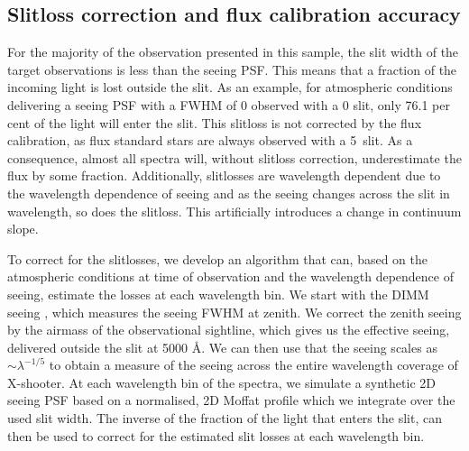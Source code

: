 \documentclass[longauth]{aa}    %
\begin{document}
                                                                                           


\subsection{Slitloss correction and flux calibration accuracy} \label{fluxes}

For the majority of the observation presented in this sample, the slit width of
the target observations is less than the seeing PSF. This means that a fraction
of the incoming light is lost outside the slit. As an example, for atmospheric
conditions delivering a seeing PSF with a FWHM of 0 observed with a
0 slit, only 76.1 per cent of the light will enter the slit. This slitloss
is not corrected by the flux calibration, as flux standard stars are always
observed with a 5~\arcsec slit. As a consequence, almost all spectra will,
without slitloss correction, underestimate the flux by some fraction.
Additionally, slitlosses are wavelength dependent due to the wavelength
dependence of seeing \citep{Boyd1978} and as the seeing changes across the slit
in wavelength, so does the slitloss. This artificially introduces a change in
continuum slope.

To correct for the slitlosses, we develop an algorithm that can, based on the
atmospheric conditions at time of observation and the wavelength dependence of
seeing, estimate the losses at each wavelength bin. We start with the DIMM
seeing \citep{Sarazin1990}, which measures the seeing FWHM at zenith. We correct
the zenith seeing by the airmass of the observational sightline, which gives us
the effective seeing, delivered outside the slit at 5000 \AA. We can then use
that the seeing scales as $\sim \lambda^{-1/5}$ to obtain a measure of the
seeing across the entire wavelength coverage of X-shooter. At each wavelength
bin of the spectra, we simulate a synthetic 2D seeing PSF based on a normalised,
2D Moffat profile which we integrate over the used slit width. The inverse of
the fraction of the light that enters the slit, can then be used to correct for
the estimated slit losses at each wavelength bin.
\end{document}

